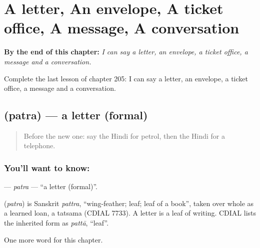 
\chapter{A letter, An envelope, A ticket office, A message, A conversation}
\label{ch:hi-a-letter-an-envelope-a-ticket-office-a-message-a-conversation}

\begin{chapteropening}
\textbf{By the end of this chapter:} \emph{I can say a letter, an envelope, a ticket office, a message and a conversation.}

Complete the last lesson of chapter 205: I can say a letter, an envelope, a ticket office, a message and a conversation.
\end{chapteropening}

\section[\texorpdfstring{\hi{पत्र} (patra)}{पत्र (patra)}]{ (patra) — a letter (formal)}

\label{lesson:HI-C205-patra}



\begin{quote}
Before the new one: say the Hindi for petrol, then the Hindi for a telephone.
\end{quote}

\subsection*{You'll want to know: }
\textbf{} — \emph{patra} — \textquotedblleft{}a letter (formal)\textquotedblright{}.

\begin{cousinweb}
\textbf{} (\emph{patra}) is Sanskrit \emph{pattra}, \textquotedblleft{}wing-feather; leaf; leaf of a book\textquotedblright{}, taken over whole as a learned loan, a tatsama (CDIAL 7733). A letter is a leaf of writing. CDIAL lists the inherited form as \emph{pattā}, \textquotedblleft{}leaf\textquotedblright{}.
\end{cousinweb}

\begin{grammarlens}[title={What you've built}]
One more word for this chapter.
\end{grammarlens}

